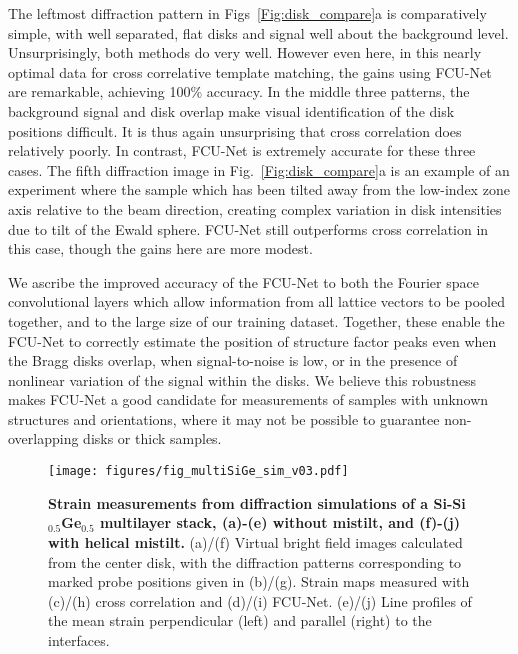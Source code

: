 \documentclass[%
 reprint,
superscriptaddress,
 amsmath,
 amssymb,
 prl,
]{revtex4-2}
\begin{document}
The leftmost diffraction pattern in Figs~\ref{Fig:disk_compare}a is comparatively simple, with well separated, flat disks and signal well about the background level.  Unsurprisingly, both methods do very well.  However even here, in this nearly optimal data for cross correlative template matching, the gains using FCU-Net are remarkable, achieving 100\% accuracy.  In the middle three patterns, the background signal and disk overlap make visual identification of the disk positions difficult.  It is thus again unsurprising that cross correlation does relatively poorly.  In contrast, FCU-Net is extremely accurate for these three cases.  The fifth diffraction image in Fig.~\ref{Fig:disk_compare}a is an example of an experiment where the sample which has been tilted away from the low-index zone axis relative to the beam direction, creating complex variation in disk intensities due to tilt of the Ewald sphere. FCU-Net still outperforms cross correlation in this case, though the gains here are more modest.

We ascribe the improved accuracy of the FCU-Net to both the Fourier space convolutional layers which allow information from all lattice vectors to be pooled together, and to the large size of our training dataset.  Together, these enable the FCU-Net to correctly estimate the position of structure factor peaks even when the Bragg disks overlap, when signal-to-noise is low, or in the presence of nonlinear variation of the signal within the disks. We believe this robustness makes FCU-Net a good candidate for measurements of samples with unknown structures and orientations, where it may not be possible to guarantee non-overlapping disks or thick samples.

\begin{figure*}[htbp]
\texttt{[image: figures/fig\_multiSiGe\_sim\_v03.pdf]}
\caption{{\bf Strain measurements from diffraction simulations of a Si-Si$_{0.5}$Ge$_{0.5}$ multilayer stack, (a)-(e) without mistilt, and (f)-(j) with helical mistilt.}
(a)/(f) Virtual bright field images calculated from the center disk, with the diffraction patterns corresponding to marked probe positions given in (b)/(g). Strain maps measured with (c)/(h) cross correlation and (d)/(i) FCU-Net. (e)/(j) Line profiles of the mean strain perpendicular (left) and parallel (right) to the interfaces.}
\centering
\label{Fig:simulated_strain}
\end{figure*}

\end{document}
